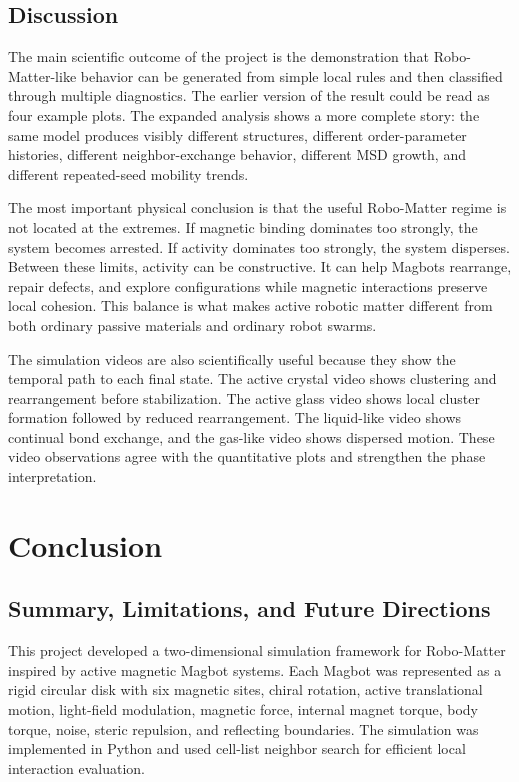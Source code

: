 \documentclass[12pt,a4paper,oneside]{report}
\begin{document}
\section{Discussion}
The main scientific outcome of the project is the demonstration that Robo-Matter-like behavior can be generated from simple local rules and then classified through multiple diagnostics. The earlier version of the result could be read as four example plots. The expanded analysis shows a more complete story: the same model produces visibly different structures, different order-parameter histories, different neighbor-exchange behavior, different MSD growth, and different repeated-seed mobility trends.

The most important physical conclusion is that the useful Robo-Matter regime is not located at the extremes. If magnetic binding dominates too strongly, the system becomes arrested. If activity dominates too strongly, the system disperses. Between these limits, activity can be constructive. It can help Magbots rearrange, repair defects, and explore configurations while magnetic interactions preserve local cohesion. This balance is what makes active robotic matter different from both ordinary passive materials and ordinary robot swarms.

The simulation videos are also scientifically useful because they show the temporal path to each final state. The active crystal video shows clustering and rearrangement before stabilization. The active glass video shows local cluster formation followed by reduced rearrangement. The liquid-like video shows continual bond exchange, and the gas-like video shows dispersed motion. These video observations agree with the quantitative plots and strengthen the phase interpretation.

\chapter{Conclusion}

\section{Summary, Limitations, and Future Directions}
This project developed a two-dimensional simulation framework for Robo-Matter inspired by active magnetic Magbot systems. Each Magbot was represented as a rigid circular disk with six magnetic sites, chiral rotation, active translational motion, light-field modulation, magnetic force, internal magnet torque, body torque, noise, steric repulsion, and reflecting boundaries. The simulation was implemented in Python and used cell-list neighbor search for efficient local interaction evaluation.
\end{document}
